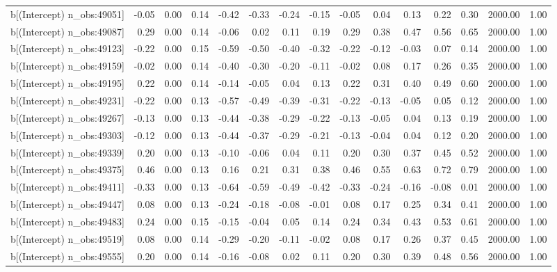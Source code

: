 \begin{table}[ht]
\begin{tabular}{rrrrrrrrrrrrrrr}
  b[(Intercept) n\_obs:49051] & -0.05 & 0.00 & 0.14 & -0.42 & -0.33 & -0.24 & -0.15 & -0.05 & 0.04 & 0.13 & 0.22 & 0.30 & 2000.00 & 1.00 \\ 
  b[(Intercept) n\_obs:49087] & 0.29 & 0.00 & 0.14 & -0.06 & 0.02 & 0.11 & 0.19 & 0.29 & 0.38 & 0.47 & 0.56 & 0.65 & 2000.00 & 1.00 \\ 
  b[(Intercept) n\_obs:49123] & -0.22 & 0.00 & 0.15 & -0.59 & -0.50 & -0.40 & -0.32 & -0.22 & -0.12 & -0.03 & 0.07 & 0.14 & 2000.00 & 1.00 \\ 
  b[(Intercept) n\_obs:49159] & -0.02 & 0.00 & 0.14 & -0.40 & -0.30 & -0.20 & -0.11 & -0.02 & 0.08 & 0.17 & 0.26 & 0.35 & 2000.00 & 1.00 \\ 
  b[(Intercept) n\_obs:49195] & 0.22 & 0.00 & 0.14 & -0.14 & -0.05 & 0.04 & 0.13 & 0.22 & 0.31 & 0.40 & 0.49 & 0.60 & 2000.00 & 1.00 \\ 
  b[(Intercept) n\_obs:49231] & -0.22 & 0.00 & 0.13 & -0.57 & -0.49 & -0.39 & -0.31 & -0.22 & -0.13 & -0.05 & 0.05 & 0.12 & 2000.00 & 1.00 \\ 
  b[(Intercept) n\_obs:49267] & -0.13 & 0.00 & 0.13 & -0.44 & -0.38 & -0.29 & -0.22 & -0.13 & -0.05 & 0.04 & 0.13 & 0.19 & 2000.00 & 1.00 \\ 
  b[(Intercept) n\_obs:49303] & -0.12 & 0.00 & 0.13 & -0.44 & -0.37 & -0.29 & -0.21 & -0.13 & -0.04 & 0.04 & 0.12 & 0.20 & 2000.00 & 1.00 \\ 
  b[(Intercept) n\_obs:49339] & 0.20 & 0.00 & 0.13 & -0.10 & -0.06 & 0.04 & 0.11 & 0.20 & 0.30 & 0.37 & 0.45 & 0.52 & 2000.00 & 1.00 \\ 
  b[(Intercept) n\_obs:49375] & 0.46 & 0.00 & 0.13 & 0.16 & 0.21 & 0.31 & 0.38 & 0.46 & 0.55 & 0.63 & 0.72 & 0.79 & 2000.00 & 1.00 \\ 
  b[(Intercept) n\_obs:49411] & -0.33 & 0.00 & 0.13 & -0.64 & -0.59 & -0.49 & -0.42 & -0.33 & -0.24 & -0.16 & -0.08 & 0.01 & 2000.00 & 1.00 \\ 
  b[(Intercept) n\_obs:49447] & 0.08 & 0.00 & 0.13 & -0.24 & -0.18 & -0.08 & -0.01 & 0.08 & 0.17 & 0.25 & 0.34 & 0.41 & 2000.00 & 1.00 \\ 
  b[(Intercept) n\_obs:49483] & 0.24 & 0.00 & 0.15 & -0.15 & -0.04 & 0.05 & 0.14 & 0.24 & 0.34 & 0.43 & 0.53 & 0.61 & 2000.00 & 1.00 \\ 
  b[(Intercept) n\_obs:49519] & 0.08 & 0.00 & 0.14 & -0.29 & -0.20 & -0.11 & -0.02 & 0.08 & 0.17 & 0.26 & 0.37 & 0.45 & 2000.00 & 1.00 \\ 
  b[(Intercept) n\_obs:49555] & 0.20 & 0.00 & 0.14 & -0.16 & -0.08 & 0.02 & 0.11 & 0.20 & 0.30 & 0.39 & 0.48 & 0.56 & 2000.00 & 1.00 \\ 

\end{tabular}
\end{table}

